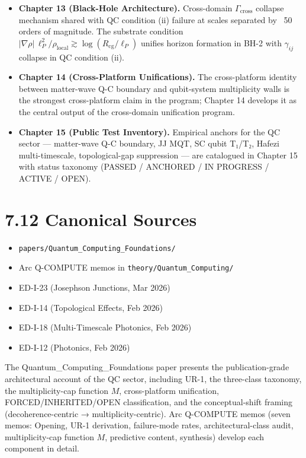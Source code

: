 \documentclass[11pt]{book}
\begin{document}
\begin{itemize}
\item \textbf{Chapter 13 (Black-Hole Architecture).} Cross-domain $\Gamma_\mathrm{cross}$ collapse mechanism shared with QC condition (ii) failure at scales separated by ~50 orders of magnitude. The substrate condition $|\nabla\rho|\,\ell_P^2/\rho_\mathrm{local} \gtrsim \log(R_\mathrm{cg}/\ell_P)$ unifies horizon formation in BH-2 with $\gamma_{ij}$ collapse in QC condition (ii).
\item \textbf{Chapter 14 (Cross-Platform Unifications).} The cross-platform identity between matter-wave Q-C boundary and qubit-system multiplicity walls is the strongest cross-platform claim in the program; Chapter 14 develops it as the central output of the cross-domain unification program.
\item \textbf{Chapter 15 (Public Test Inventory).} Empirical anchors for the QC sector — matter-wave Q-C boundary, JJ MQT, SC qubit T₁/T₂, Hafezi multi-timescale, topological-gap suppression — are catalogued in Chapter 15 with status taxonomy (PASSED / ANCHORED / IN PROGRESS / ACTIVE / OPEN).
\end{itemize}

\section{7.12 Canonical Sources}

\begin{itemize}
\item \texttt{papers/Quantum\_Computing\_Foundations/}
\item Arc Q-COMPUTE memos in \texttt{theory/Quantum\_Computing/}
\item ED-I-23 (Josephson Junctions, Mar 2026)
\item ED-I-14 (Topological Effects, Feb 2026)
\item ED-I-18 (Multi-Timescale Photonics, Feb 2026)
\item ED-I-12 (Photonics, Feb 2026)
\end{itemize}

The Quantum\_Computing\_Foundations paper presents the publication-grade architectural account of the QC sector, including UR-1, the three-class taxonomy, the multiplicity-cap function $M$, cross-platform unification, FORCED/INHERITED/OPEN classification, and the conceptual-shift framing (decoherence-centric → multiplicity-centric). Arc Q-COMPUTE memos (seven memos: Opening, UR-1 derivation, failure-mode rates, architectural-class audit, multiplicity-cap function $M$, predictive content, synthesis) develop each component in detail.
\end{document}
